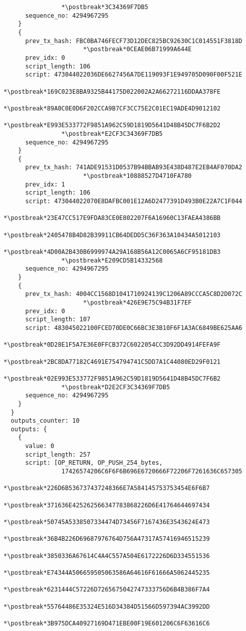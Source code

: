 \begin{lstlisting}
                *\postbreak*3C34369F7DB5
      sequence_no: 4294967295
    }
    {
      prev_tx_hash: FBC0BA746FECF73D12DEC825BC92630C1C014551F3818D
                      *\postbreak*0CEAE06B71999A644E
      prev_idx: 0
      script_length: 106
      script: 473044022036DE6627456A7DE119093F1E949705D090F00F521E
                *\postbreak*169C023E8BA9325B44175D022002A2A66272116DDAA378FE
                *\postbreak*89A0C0E0D6F202CCA9B7CF3CC75E2C01EC19ADE4D9012102
                *\postbreak*E993E533772F9851A962C59D1819D5641D48B45DC7F6B2D2
                *\postbreak*E2CF3C34369F7DB5
      sequence_no: 4294967295
    }
    {
      prev_tx_hash: 741ADE91531D0537B94BBAB93E438D487E2EB4AF070DA2
                      *\postbreak*10888527D4710FA780
      prev_idx: 1
      script_length: 106
      script: 473044022070E8DAFBC001E12A6D2477391D493B0E22A7C1F044
                *\postbreak*23E47CC517E9FDA83CE0E802207F6A16960C13FAEA4386BB
                *\postbreak*2405478B4D82B39911CB64DEDD5C36F363A10434A5012103
                *\postbreak*4D00A2B430B6999974A29A168B56A12C0065A6CF95181DB3
                *\postbreak*E209CD5B14332568
      sequence_no: 4294967295
    }
    {
      prev_tx_hash: 4004CC1568D1041710924139C1206A89CCCA5C8D2D072C
                      *\postbreak*426E9E75C94B31F7EF
      prev_idx: 0
      script_length: 107
      script: 483045022100FCED70DE0C66BC3E3B10F6F1A3AC6849BE625AA6
                *\postbreak*0D28E1F5A7E36E0FFCB372C6022054CC3D92DD4914FEFA9F
                *\postbreak*2BC8DA77182C4691E754794741C5DD7A1C44080ED29F0121
                *\postbreak*02E993E533772F9851A962C59D1819D5641D48B45DC7F6B2
                *\postbreak*D2E2CF3C34369F7DB5
      sequence_no: 4294967295
    }
  }
  outputs_counter: 10
  outputs: {
    {
      value: 0
      script_length: 257
      script: [OP_RETURN, OP_PUSH_254_bytes,
                17426574206C6F6F6B696E6720666F72206F7261636C657305
                  *\postbreak*226D6B536737437248366E7A584145753753454E6F6B7
                  *\postbreak*371636E425262566347783868226D6E41764644697434
                  *\postbreak*50745A5338507334474D73456F7167436E3543624E473
                  *\postbreak*36B4B226D69687976764D756A47317A57416946515239
                  *\postbreak*3850336A67614C4A4C557A504E6172226D6D334551536
                  *\postbreak*E74344A506659505063586A64616F61666A5062445235
                  *\postbreak*6231444C57226D7265675042747333756D6B4B386F7A4
                  *\postbreak*55764486E35324E516D34384D51566D597394AC3992DD
                  *\postbreak*3B975DCA40927169D471EBE00F19E601206C6F63616C6

\end{lstlisting}
